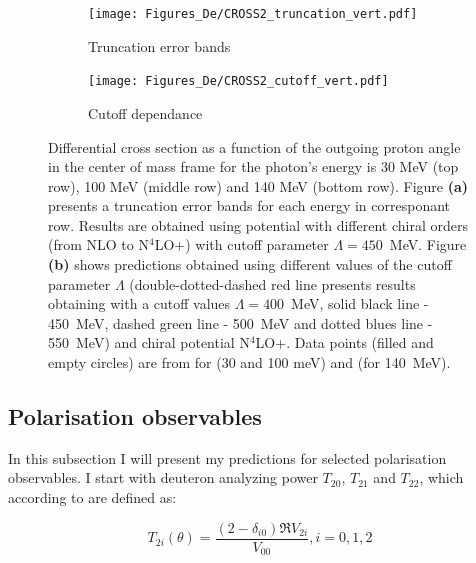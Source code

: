     \begin{figure}[h]
        \centering
        \begin{subfigure}[b]{0.46\textwidth}
            \texttt{[image: Figures\_De/CROSS2\_truncation\_vert.pdf]}
            \caption{Truncation error bands}
            \label{Diff_cross_truncation}
        \end{subfigure}
        \begin{subfigure}[b]{0.46\textwidth}
            \texttt{[image: Figures\_De/CROSS2\_cutoff\_vert.pdf]}
            \caption{Cutoff dependance}
            \label{Diff_cross_cutoff}
        \end{subfigure}
        \caption{Differential cross section as a function of the outgoing proton angle in the center of mass frame 
        for the photon's energy is 30 MeV (top row), 100 MeV (middle row) and 140 MeV (bottom row).
        Figure {\bf(a)} presents a truncation error bands for each energy in corresponant row. 
        Results are obtained using potential with different chiral orders (from NLO to N$^4$LO+) 
        with cutoff parameter $\Lambda=450$~MeV.
        Figure {\bf (b)} shows predictions obtained using different values of the cutoff parameter $\Lambda$
        (double-dotted-dashed red line presents results obtaining with 
        a cutoff values $\Lambda=400$~MeV, solid black line - 450~MeV, dashed green line - 500~MeV
        and dotted blues line - 550~MeV) and chiral potential N$^4$LO+. 
        Data points (filled and empty circles) are from \cite{Ying_Experiment_Deut}
        for (30 and 100 meV)
        and \cite{DeSanctis_Experiment_Deut} (for 140~MeV).}
        \label{Diff_cross_err}
    \end{figure}


    \clearpage

    \subsection{Polarisation observables}
    \label{tensor_results}

    In this subsection I will present my predictions for 
    selected polarisation observables.
    I start with deuteron analyzing power $T_{20}$, $T_{21}$ and $T_{22}$,
    which according to \cite{ArenhovelPhotodisint1991} are defined as:
    
    \begin{equation}
        T_{2i} (\theta) = \frac{(2 - \delta_{i0}) \Re V_{2i}}{V_{00}}, i=0,1,2
    \end{equation}

